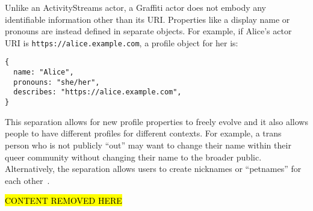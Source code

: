 Unlike an ActivityStreams actor, a Graffiti actor does not embody
any identifiable information other than its
URI.
Properties like a display name or pronouns are instead
defined in separate objects.
For example, if Alice's actor URI is
\texttt{https://\allowbreak{}alice.\allowbreak{}example.\allowbreak{}com}, a profile object for her is:
\begin{verbatim}
{
  name: "Alice",
  pronouns: "she/her",
  describes: "https://alice.example.com",
}
\end{verbatim}

This separation allows for new profile
properties to freely evolve
and it also allows people to have different profiles for different contexts.
For example, a trans person who is not publicly ``out'' may want to
change their name within their queer community without
changing their name to the broader public.
Alternatively, the separation allows users to create nicknames
or ``petnames'' for each other~\cite{petnames}.

\hl{CONTENT REMOVED HERE}




